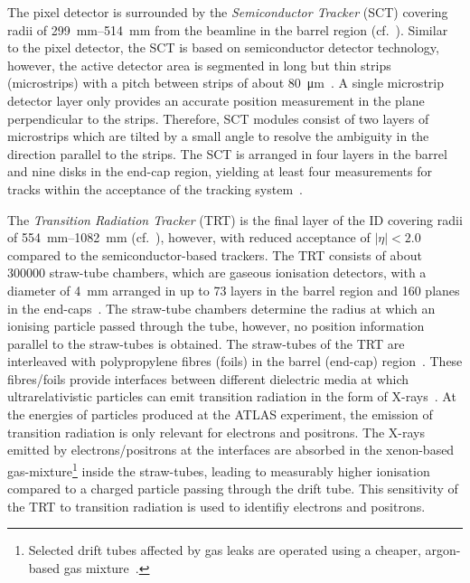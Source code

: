 The pixel detector is surrounded by the \emph{Semiconductor Tracker} (SCT)
covering radii of \SIrange{299}{514}{\milli\metre} from the beamline in the
barrel region (cf.\ ). Similar to the pixel
detector, the SCT is based on semiconductor detector technology, however, the
active detector area is segmented in long but thin strips (microstrips) with a
pitch between strips of about \SI{80}{\micro\metre}~\cite{PERF-2007-01}. A
single microstrip detector layer only provides an accurate position measurement
in the plane perpendicular to the strips. Therefore, SCT modules consist of two
layers of microstrips which are tilted by a small angle to resolve the ambiguity
in the direction parallel to the strips. The SCT is arranged in four layers in
the barrel and nine disks in the end-cap region, yielding at least four
measurements for tracks within the acceptance of the tracking
system~\cite{PERF-2007-01}.

The \emph{Transition Radiation Tracker} (TRT) is the final layer of the ID
covering radii of \SIrange{554}{1082}{\milli\metre} (cf.\
), however, with reduced acceptance of
$|\eta| < 2.0$ compared to the semiconductor-based trackers. The TRT consists of
about \num{300000} straw-tube chambers, which are gaseous ionisation detectors,
with a diameter of \SI{4}{\milli\metre} arranged in up to 73 layers in the
barrel region and 160 planes in the end-caps~\cite{PERF-2007-01}. The straw-tube
chambers determine the radius at which an ionising particle passed through the
tube, however, no position information parallel to the straw-tubes is obtained.
The straw-tubes of the TRT are interleaved with polypropylene fibres (foils) in
the barrel (end-cap) region~\cite{PERF-2007-01}. These fibres/foils provide
interfaces between different dielectric media at which ultrarelativistic
particles can emit transition radiation in the form of
X-rays~\cite{Grupen:2008zz}. At the energies of particles produced at the ATLAS
experiment, the emission of transition radiation is only relevant for electrons
and positrons. The X-rays emitted by electrons/positrons at the interfaces are
absorbed in the xenon-based gas-mixture\footnote{Selected drift tubes affected
  by gas leaks are operated using a cheaper, argon-based gas
  mixture~\cite{IDET-2015-01}.} inside the straw-tubes, leading to measurably
higher ionisation compared to a charged particle passing through the drift
tube. This sensitivity of the TRT to transition radiation is used to identifiy
electrons and positrons.

